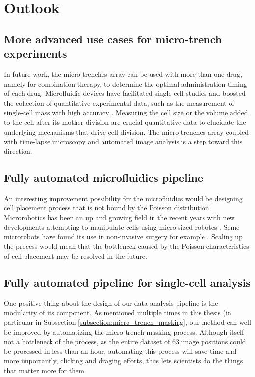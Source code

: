 \documentclass[pdftex,12pt,a4paper]{report}
\begin{document}

\section{Outlook}

\subsection{More advanced use cases for micro-trench experiments}

In future work, the micro-trenches array can be used with more than one drug, namely for combination therapy, to determine the optimal administration timing of each drug. Microfluidic devices have facilitated single-cell studies and boosted the collection of quantitative experimental data, such as the measurement of single-cell mass with high accuracy \cite{son2012direct}. Measuring the cell size or the volume added to the cell after its mother division are crucial quantitative data to elucidate the underlying mechanisms that drive cell division. The micro-trenches array coupled with time-lapse microscopy and automated image analysis is a step toward this direction.

\subsection{Fully automated microfluidics pipeline}

An interesting improvement possibility for the microfluidics would be designing cell placement process that is not bound by the Poisson distribution. Microrobotics has been an up and growing field in the recent years with new developments attempting to manipulate cells using micro-sized robotcs \cite{kim2008nanonewton}. Some microrobots have found its use in non-invasive surgery for example \cite{nelson2010microrobots}. Scaling up the process would mean that the bottleneck caused by the Poisson characteristics of cell placement may be resolved in the future.

\subsection{Fully automated pipeline for single-cell analysis}

One positive thing about the design of our data analysis pipeline is the modularity of its component. As mentioned multiple times in this thesis (in particular in Subsection \ref{subsection:micro_trench_masking}, our method can well be improved by automatizing the micro-trench masking process. Although itself not a bottleneck of the process, as the entire dataset of 63 image positions could be processed in less than an hour, automating this process will save time and more importantly, clicking and draging efforts, thus lets scientists do the things that matter more for them.
\end{document}
